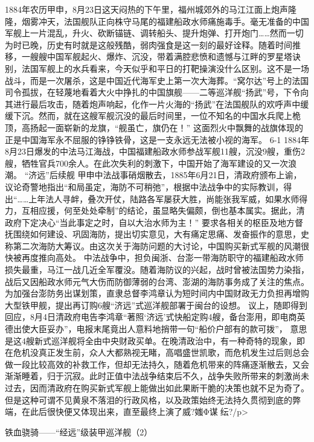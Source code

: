 \documentclass[12pt,UTF8]{ctexbook}
\begin{document}
1884年农历甲申，8月23日这天闷热的下午里，福州城郊外的马江江面上炮声隆隆，烟雾冲天，法国舰队正向株守马尾的福建船政水师痛施毒手。毫无准备的中国军舰上一片混乱，升火、砍断锚链、调转船头、提升炮弹、打开炮门……然而一切为时已晚，历史有时就是这般残酷，弱肉强食是这一刻的最好诠释。随着时间推移，一艘艘中国军舰起火、爆炸、沉没，带着满腔悲愤和遗憾与江畔的罗星塔诀别，法国军舰上的水兵看来，今天似乎和平日的打靶操演没什么区别。这不是一场战斗，而是一次屠杀，这是中国近代海军史上第一次大海葬。“窝尔达”号上的法国司令孤拔，在轻蔑地看着大火中挣扎的中国旗舰——二等巡洋舰“扬武”号，下令向其进行最后攻击，随着炮声响起，化作一片火海的“扬武”在法国舰队的欢呼声中缓缓下沉。然而，就在这艘军舰沉没的最后时间里，一位不知名的中国水兵爬上桅顶，高扬起一面崭新的龙旗，“舰虽亡，旗仍在！” 这面烈火中飘舞的战旗体现的正是中国海军永不屈服的铮铮铁骨，这是一支永远无法被小视的海军。
6-1
1884年8月23日爆发的中法马江海战，中国福建船政水师参战军舰11艘，沉没9艘，重伤2艘，牺牲官兵700余人。在此次失利的刺激下，中国开始了海军建设的又一次浪潮。
“济远”后续舰
甲申中法战事硝烟散去，1885年6月21日，清政府颁布上谕，议论奇警地指出“和局虽定，海防不可稍弛”，根据中法战争中的实际教训，得出“……上年法人寻衅，叠次开仗，陆路各军屡获大胜，尚能张我军威，如果水师得力，互相应援，何至处处牵制”的结论，虽显略失偏颇，倒也基本属实。据此，清政府下定决心“当此事定之时，自以大治水师为主！” 要求各相关的枢臣及地方督抚围绕如何建设、巩固海防，提出切实意见，大有痛定思痛、发奋振作的意思，史称第二次海防大筹议。由这次关于海防问题的大讨论，中国购买新式军舰的风潮很快被再度推向高处。
中法战争中，担负闽浙、台澎一带海防职守的福建船政水师损失最重，马江一战几近全军覆没。随着海防议的兴起，战时曾被法国势力染指，战后又因船政水师元气大伤而防御薄弱的台湾、澎湖的海防事务成了关注的焦点。为加强台澎防务出谋划策，直隶总督李鸿章认为短时间内中国财政无力负担再增购大型铁甲舰，提出再订购6艘“济远”式巡洋舰部署于闽台的设想。 议上，随即得到回应，8月4日清政府电告李鸿章“著照‘济远’式快船定购4艘，备台澎用，即电商英德出使大臣妥办”，电报末尾竟出人意料地捎带一句“船价户部有的款可拨”， 意思是这4艘新式巡洋舰将全由中央财政买单。在晚清政治中，有一种奇特的现象，即在危机没真正发生前，众人大都熟视无睹，高唱盛世凯歌，而危机发生过后则总会做一段比较高效的补救工作，但却无法持久，随着危机带来的阵痛逐渐散去，又会渐渐睡着，归于沉寂。此时正值中法战争结束后不久，战争失败所带来的刺激尚未过去，因而清政府在购买新式军舰上能做出如此果断干脆的决策也就不足为奇了。但是这种可谓不见黄泉不落泪的行政风格，以及政策始终无法持久贯彻到底的弊端，在此后很快便又体现出来，直至最终上演了威?媸Φ谋纭?/p>




铁血骁骑——“经远”级装甲巡洋舰（2）
\end{document}
